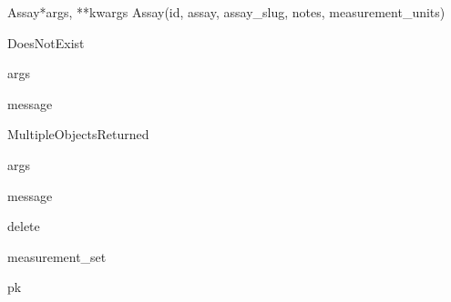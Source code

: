 \documentclass[letterpaper,10pt,english]{sphinxmanual}
\begin{document}
\hypertarget{data.models.Assay}{}\begin{classdesc}{Assay}{*args, **kwargs}
Assay(id, assay, assay\_slug, notes, measurement\_units)

\hypertarget{data.models.Assay.DoesNotExist}{}\begin{excdesc}{DoesNotExist}~

\hypertarget{data.models.Assay.DoesNotExist.args}{}\begin{memberdesc}{args}\end{memberdesc}

\hypertarget{data.models.Assay.DoesNotExist.message}{}\begin{memberdesc}{message}\end{memberdesc}
\end{excdesc}

\hypertarget{data.models.Assay.MultipleObjectsReturned}{}\begin{excdesc}{MultipleObjectsReturned}~

\hypertarget{data.models.Assay.MultipleObjectsReturned.args}{}\begin{memberdesc}{args}\end{memberdesc}

\hypertarget{data.models.Assay.MultipleObjectsReturned.message}{}\begin{memberdesc}{message}\end{memberdesc}
\end{excdesc}

\hypertarget{data.models.Assay.delete}{}\begin{methoddesc}[Assay]{delete}{}\end{methoddesc}

\hypertarget{data.models.Assay.measurement_set}{}\begin{memberdesc}[Assay]{measurement\_set}\end{memberdesc}

\hypertarget{data.models.Assay.pk}{}\begin{memberdesc}[Assay]{pk}\end{memberdesc}


\end{classdesc}
\end{document}
